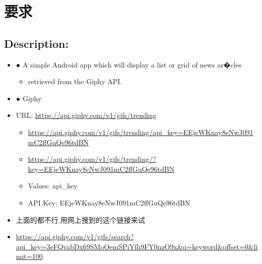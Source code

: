 \documentclass[9pt, b5paper]{article}
\begin{document}
\section{要求}
\label{sec-2}
\subsection{Description:}
\label{sec-2-1}
\begin{itemize}
\item ● A simple Android app which will display a list or grid of news ar�cles
\begin{itemize}
\item retrieved from the Giphy API.
\end{itemize}
\item ● Giphy
\item URL: \url{https://api.giphy.com/v1/gifs/trending}
\begin{itemize}
\item \url{https://api.giphy.com/v1/gifs/trending/api_key=EEjeWKnay8eNwJ091mC2ffGuQe96tdBN}
\item \url{https://api.giphy.com/v1/gifs/trending/?key=EEjeWKnay8eNwJ091mC2ffGuQe96tdBN}
\item Values: api\_key
\item API Key: EEjeWKnay8eNwJ091mC2ffGuQe96tdBN
\end{itemize}
\item 上面的都不行.用网上搜到的这个链接来试
\item \url{https://api.giphy.com/v1/gifs/search?api_key=3eFQvabDx69SMoOemSPiYfh9FY0nzO9x&q=keyword&offset=0&limit=100}
\end{itemize}
\end{document}
